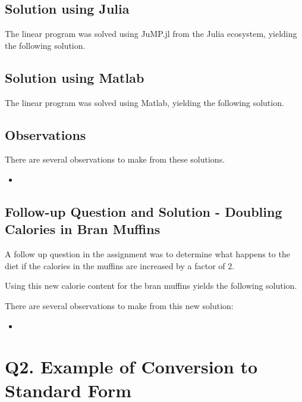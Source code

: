 \documentclass{article}
\begin{document}
    \subsection{Solution using Julia}

    The linear program was solved using JuMP.jl from the Julia ecosystem, yielding the following solution.


    \subsection{Solution using Matlab}

    The linear program was solved using Matlab, yielding the following solution.


    \subsection{Observations}

    There are several observations to make from these solutions.

    \begin{itemize}
        \item 
    \end{itemize}

    \subsection{Follow-up Question and Solution - Doubling Calories in Bran Muffins}

    A follow up question in the assignment was to determine what happens to the diet if the calories in the muffins are increased by a factor of 2.

    Using this new calorie content for the bran muffins yields the following solution.


    There are several observations to make from this new solution:

    \begin{itemize}
        \item 
    \end{itemize}


    \section{Q2. Example of Conversion to Standard Form}
\end{document}
